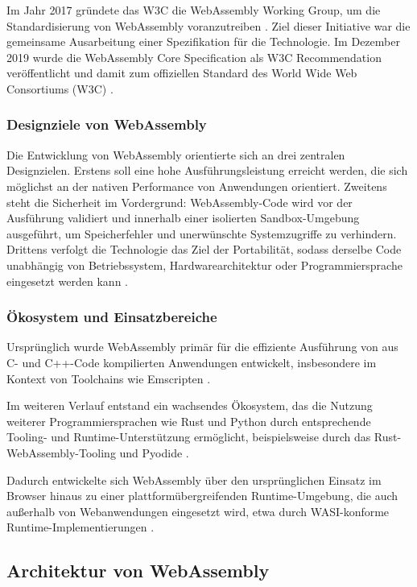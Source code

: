 Im Jahr 2017 gründete das W3C die WebAssembly Working Group, um die Standardisierung von WebAssembly voranzutreiben \cite{w3c2017wasmwg}. Ziel dieser Initiative war die gemeinsame Ausarbeitung einer Spezifikation für die Technologie. Im Dezember 2019 wurde die WebAssembly Core Specification als W3C Recommendation veröffentlicht und damit zum offiziellen Standard des World Wide Web Consortiums (W3C) \cite{w3c2019wasmrec}.

\subsubsection{Designziele von WebAssembly}

Die Entwicklung von WebAssembly orientierte sich an drei zentralen Designzielen. Erstens soll eine hohe Ausführungsleistung erreicht werden, die sich möglichst an der nativen Performance von Anwendungen orientiert. Zweitens steht die Sicherheit im Vordergrund: WebAssembly-Code wird vor der Ausführung validiert und innerhalb einer isolierten Sandbox-Umgebung ausgeführt, um Speicherfehler und unerwünschte Systemzugriffe zu verhindern. Drittens verfolgt die Technologie das Ziel der Portabilität, sodass derselbe Code unabhängig von Betriebssystem, Hardwarearchitektur oder Programmiersprache eingesetzt werden kann \cite{wasmcoreW3C}.

\subsubsection{Ökosystem und Einsatzbereiche}

Ursprünglich wurde WebAssembly primär für die effiziente Ausführung von aus C- und C++-Code kompilierten Anwendungen entwickelt, insbesondere im Kontext von Toolchains wie Emscripten \cite{emscripten}.

Im weiteren Verlauf entstand ein wachsendes Ökosystem, das die Nutzung weiterer Programmiersprachen wie Rust und Python durch entsprechende Tooling- und Runtime-Unterstützung ermöglicht, beispielsweise durch das Rust-WebAssembly-Tooling und Pyodide \cite{rust_wasm,pyodide}.

Dadurch entwickelte sich WebAssembly über den ursprünglichen Einsatz im Browser hinaus zu einer plattformübergreifenden Runtime-Umgebung, die auch außerhalb von Webanwendungen eingesetzt wird, etwa durch WASI-konforme Runtime-Implementierungen \cite{wasmcoreW3C,bytecode_alliance}.

\subsection{Architektur von WebAssembly}

